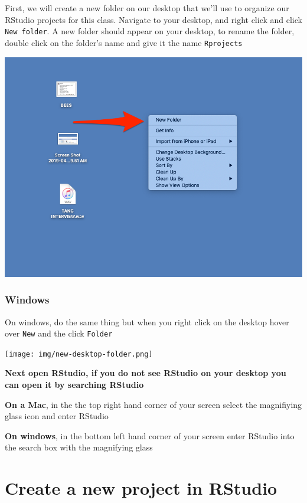 \documentclass[
]{article}
\begin{document}
First, we will create a new folder on our desktop that we'll use to
organize our RStudio projects for this class. Navigate to your desktop,
and right click and click \texttt{New\ folder}. A new folder should
appear on your desktop, to rename the folder, double click on the
folder's name and give it the name \texttt{Rprojects}

\includegraphics{img/mac-file-create.png}

\hypertarget{windows}{%
\subsubsection{\texorpdfstring{\textbf{Windows
}}{Windows }}\label{windows}}

On windows, do the same thing but when you right click on the desktop
hover over \texttt{New} and the click \texttt{Folder}

\texttt{[image: img/new-desktop-folder.png]}

\textbf{Next open RStudio, if you do not see RStudio on your desktop you
can open it by searching RStudio}

\textbf{On a Mac}, in the the top right hand corner of your screen
select the magnifiying glass icon and enter RStudio

\textbf{On windows}, in the bottom left hand corner of your screen enter
RStudio into the search box with the magnifying glass

\hypertarget{create-a-new-project-in-rstudio}{%
\section{\texorpdfstring{\textbf{Create a new project in
RStudio}}{Create a new project in RStudio}}\label{create-a-new-project-in-rstudio}}
\end{document}
